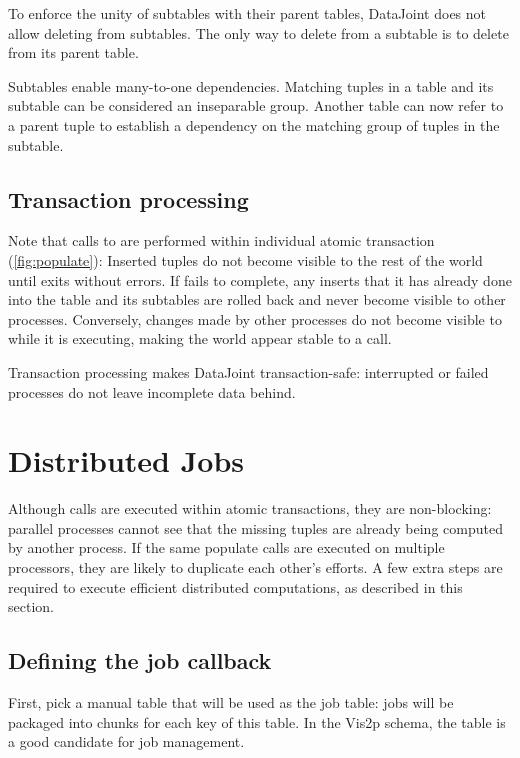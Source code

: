 \documentclass[10pt]{article}
\begin{document}
To enforce the unity of subtables with their parent tables, DataJoint does not allow deleting from subtables.  The only way to delete from a subtable is to delete from its parent table.

Subtables enable many-to-one dependencies. Matching tuples in a table and its subtable can be considered an inseparable group. Another table can now refer to a parent tuple to establish a dependency on the matching group of tuples in the subtable.

\subsection{Transaction processing}
Note that calls to  are performed within individual atomic transaction (\autoref{fig:populate}): Inserted tuples do not become visible to the rest of the world until  exits without errors.   If  fails to complete, any inserts that it has already done into the table and its subtables are rolled back and never become visible to other processes. Conversely, changes made by other processes do not become visible to  while it is executing, making the world appear stable to a  call.  

Transaction processing makes DataJoint transaction-safe: interrupted or failed processes do not leave incomplete data behind.


\newpage\section{Distributed Jobs}
Although  calls are executed within atomic transactions, they are non-blocking: parallel processes cannot see that the missing tuples are already being computed by another process.  If the same populate calls are executed on multiple processors, they are likely to duplicate each other's efforts.  A few extra steps are required to execute efficient distributed computations, as described in this section.

\subsection{Defining the job callback}
First, pick a manual table that will be used as the job table: jobs will be packaged into chunks for each key of this table.  In the Vis2p schema, the  table is a good candidate for job management. 
\end{document}
